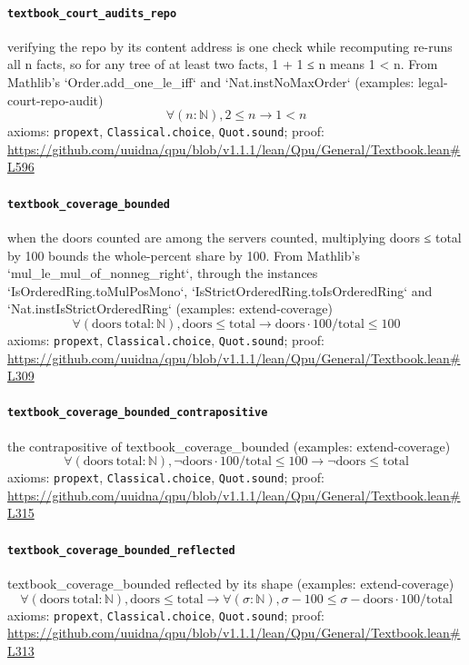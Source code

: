 \documentclass[11pt]{article}
\begin{document}
\paragraph{\texttt{textbook\_court\_audits\_repo}}
verifying the repo by its content address is one check while recomputing re-runs all n facts, so for any tree of at least two facts, 1 + 1 ≤ n means 1 < n. From Mathlib's `Order.add\_one\_le\_iff` and `Nat.instNoMaxOrder` (examples: legal-court-repo-audit)
\[ \forall (n : \mathbb{N}), 2 \le n \to 1 < n \]
\noindent axioms: \texttt{propext}, \texttt{Classical.choice}, \texttt{Quot.sound}; proof: \url{https://github.com/uuidna/qpu/blob/v1.1.1/lean/Qpu/General/Textbook.lean\#L596}

\paragraph{\texttt{textbook\_coverage\_bounded}}
when the doors counted are among the servers counted, multiplying doors ≤ total by 100 bounds the whole-percent share by 100. From Mathlib's `mul\_le\_mul\_of\_nonneg\_right`, through the instances `IsOrderedRing.toMulPosMono`, `IsStrictOrderedRing.toIsOrderedRing` and `Nat.instIsStrictOrderedRing` (examples: extend-coverage)
\[ \forall (\mathrm{doors}\ \mathrm{total} : \mathbb{N}), \mathrm{doors} \le \mathrm{total} \to \mathrm{doors} \cdot 100 / \mathrm{total} \le 100 \]
\noindent axioms: \texttt{propext}, \texttt{Classical.choice}, \texttt{Quot.sound}; proof: \url{https://github.com/uuidna/qpu/blob/v1.1.1/lean/Qpu/General/Textbook.lean\#L309}

\paragraph{\texttt{textbook\_coverage\_bounded\_contrapositive}}
the contrapositive of textbook\_coverage\_bounded (examples: extend-coverage)
\[ \forall (\mathrm{doors}\ \mathrm{total} : \mathbb{N}), \neg \mathrm{doors} \cdot 100 / \mathrm{total} \le 100 \to \neg \mathrm{doors} \le \mathrm{total} \]
\noindent axioms: \texttt{propext}, \texttt{Classical.choice}, \texttt{Quot.sound}; proof: \url{https://github.com/uuidna/qpu/blob/v1.1.1/lean/Qpu/General/Textbook.lean\#L315}

\paragraph{\texttt{textbook\_coverage\_bounded\_reflected}}
textbook\_coverage\_bounded reflected by its shape (examples: extend-coverage)
\[ \forall (\mathrm{doors}\ \mathrm{total} : \mathbb{N}), \mathrm{doors} \le \mathrm{total} \to \forall (\sigma : \mathbb{N}), \sigma - 100 \le \sigma - \mathrm{doors} \cdot 100 / \mathrm{total} \]
\noindent axioms: \texttt{propext}, \texttt{Classical.choice}, \texttt{Quot.sound}; proof: \url{https://github.com/uuidna/qpu/blob/v1.1.1/lean/Qpu/General/Textbook.lean\#L313}
\end{document}
